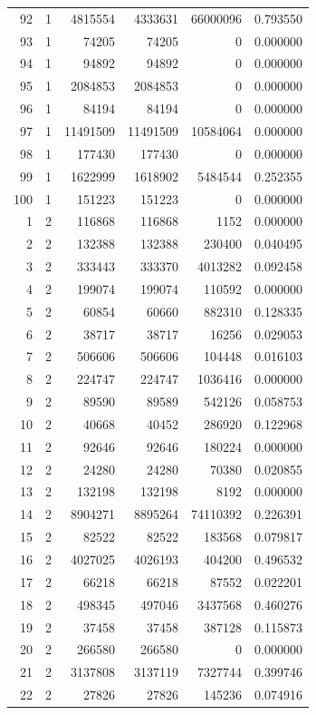 \begin{longtable}{rrrrrr}
92 & 1 & 4815554 & 4333631 & 66000096 & 0.793550\\
93 & 1 & 74205 & 74205 & 0 & 0.000000\\
94 & 1 & 94892 & 94892 & 0 & 0.000000\\
95 & 1 & 2084853 & 2084853 & 0 & 0.000000\\
96 & 1 & 84194 & 84194 & 0 & 0.000000\\
97 & 1 & 11491509 & 11491509 & 10584064 & 0.000000\\
98 & 1 & 177430 & 177430 & 0 & 0.000000\\
99 & 1 & 1622999 & 1618902 & 5484544 & 0.252355\\
100 & 1 & 151223 & 151223 & 0 & 0.000000\\
1 & 2 & 116868 & 116868 & 1152 & 0.000000\\
2 & 2 & 132388 & 132388 & 230400 & 0.040495\\
3 & 2 & 333443 & 333370 & 4013282 & 0.092458\\
4 & 2 & 199074 & 199074 & 110592 & 0.000000\\
5 & 2 & 60854 & 60660 & 882310 & 0.128335\\
6 & 2 & 38717 & 38717 & 16256 & 0.029053\\
7 & 2 & 506606 & 506606 & 104448 & 0.016103\\
8 & 2 & 224747 & 224747 & 1036416 & 0.000000\\
9 & 2 & 89590 & 89589 & 542126 & 0.058753\\
10 & 2 & 40668 & 40452 & 286920 & 0.122968\\
11 & 2 & 92646 & 92646 & 180224 & 0.000000\\
12 & 2 & 24280 & 24280 & 70380 & 0.020855\\
13 & 2 & 132198 & 132198 & 8192 & 0.000000\\
14 & 2 & 8904271 & 8895264 & 74110392 & 0.226391\\
15 & 2 & 82522 & 82522 & 183568 & 0.079817\\
16 & 2 & 4027025 & 4026193 & 404200 & 0.496532\\
17 & 2 & 66218 & 66218 & 87552 & 0.022201\\
18 & 2 & 498345 & 497046 & 3437568 & 0.460276\\
19 & 2 & 37458 & 37458 & 387128 & 0.115873\\
20 & 2 & 266580 & 266580 & 0 & 0.000000\\
21 & 2 & 3137808 & 3137119 & 7327744 & 0.399746\\
22 & 2 & 27826 & 27826 & 145236 & 0.074916\\

\end{longtable}
